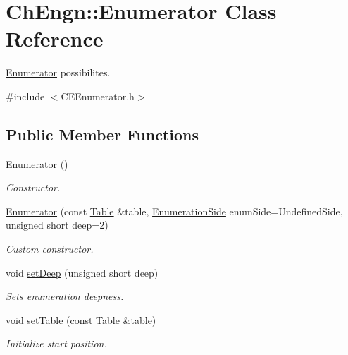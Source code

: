 \hypertarget{classChEngn_1_1Enumerator}{
\section{ChEngn::Enumerator Class Reference}
\label{classChEngn_1_1Enumerator}
}


\hyperlink{classChEngn_1_1Enumerator}{Enumerator} possibilites.  




{\ttfamily \#include $<$CEEnumerator.h$>$}

\subsection*{Public Member Functions}
\begin{DoxyCompactItemize}
\item 
\hyperlink{classChEngn_1_1Enumerator_a5103837e1ff53c5cd9dd3eba8f2bb555}{Enumerator} ()
\begin{DoxyCompactList}\small\item\em Constructor. \item\end{DoxyCompactList}\item 
\hyperlink{classChEngn_1_1Enumerator_a3f3a7d688b6753ff1b6118c43745ed79}{Enumerator} (const \hyperlink{classChEngn_1_1Table}{Table} \&table, \hyperlink{namespaceChEngn_a680bcca190861d8cee0f8627ce8f9de3}{EnumerationSide} enumSide=UndefinedSide, unsigned short deep=2)
\begin{DoxyCompactList}\small\item\em Custom constructor. \item\end{DoxyCompactList}\item 
void \hyperlink{classChEngn_1_1Enumerator_ad863ed7a8a9d3bf4c2f6515b822127b9}{setDeep} (unsigned short deep)
\begin{DoxyCompactList}\small\item\em Sets enumeration deepness. \item\end{DoxyCompactList}\item 
void \hyperlink{classChEngn_1_1Enumerator_aece55d1e95762d5a36c1bf43f72936a1}{setTable} (const \hyperlink{classChEngn_1_1Table}{Table} \&table)
\begin{DoxyCompactList}\small\item\em Initialize start position. \item\end{DoxyCompactList}\item 

\end{DoxyCompactItemize}
